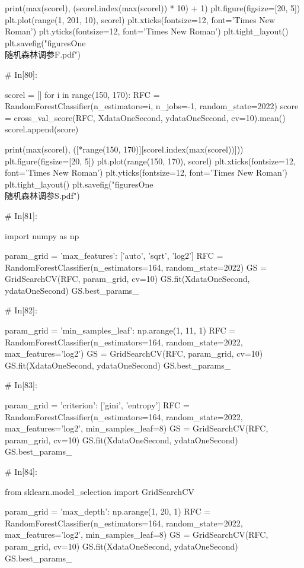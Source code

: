 \documentclass{MathorCupmodeling}
\begin{document}
\begin{python}
	print(max(scorel), (scorel.index(max(scorel)) * 10) + 1)
	plt.figure(figsize=[20, 5])
	plt.plot(range(1, 201, 10), scorel)
	plt.xticks(fontsize=12, font='Times New Roman')
	plt.yticks(fontsize=12, font='Times New Roman')
	plt.tight_layout()
	plt.savefig("figuresOne\\[附件1]随机森林调参F.pdf")
	
	# In[80]:
	
	
	scorel = []
	for i in range(150, 170):
		RFC = RandomForestClassifier(n_estimators=i,
									 n_jobs=-1,
									 random_state=2022)
		score = cross_val_score(RFC, XdataOneSecond, ydataOneSecond, cv=10).mean()
		scorel.append(score)
	
	print(max(scorel), ([*range(150, 170)][scorel.index(max(scorel))]))
	plt.figure(figsize=[20, 5])
	plt.plot(range(150, 170), scorel)
	plt.xticks(fontsize=12, font='Times New Roman')
	plt.yticks(fontsize=12, font='Times New Roman')
	plt.tight_layout()
	plt.savefig("figuresOne\\[附件1]随机森林调参S.pdf")
	
	# In[81]:
	
	
	import numpy as np
	
	param_grid = {'max_features': ['auto', 'sqrt', 'log2']}
	RFC = RandomForestClassifier(n_estimators=164, random_state=2022)
	GS = GridSearchCV(RFC, param_grid, cv=10)
	GS.fit(XdataOneSecond, ydataOneSecond)
	GS.best_params_
	
	# In[82]:
	
	
	param_grid = {'min_samples_leaf': np.arange(1, 11, 1)}
	RFC = RandomForestClassifier(n_estimators=164, random_state=2022, max_features='log2')
	GS = GridSearchCV(RFC, param_grid, cv=10)
	GS.fit(XdataOneSecond, ydataOneSecond)
	GS.best_params_
	
	# In[83]:
	
	
	param_grid = {'criterion': ['gini', 'entropy']}
	RFC = RandomForestClassifier(n_estimators=164, random_state=2022, max_features='log2', min_samples_leaf=8)
	GS = GridSearchCV(RFC, param_grid, cv=10)
	GS.fit(XdataOneSecond, ydataOneSecond)
	GS.best_params_
	
	# In[84]:
	
	
	from sklearn.model_selection import GridSearchCV
	
	param_grid = {'max_depth': np.arange(1, 20, 1)}
	RFC = RandomForestClassifier(n_estimators=164, random_state=2022, max_features='log2', min_samples_leaf=8)
	GS = GridSearchCV(RFC, param_grid, cv=10)
	GS.fit(XdataOneSecond, ydataOneSecond)
	GS.best_params_
	

\end{python}
\end{document}
